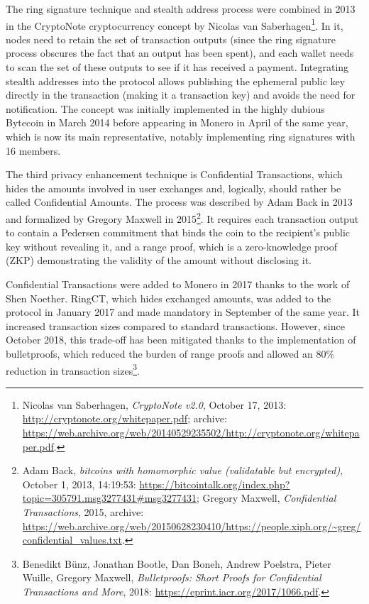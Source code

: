 \documentclass[
  a5paper,
  smalldemyvopaper,10pt,twoside,onecolumn,openright,extrafontsizes,hidelinks]{memoir}
\begin{document}
The ring signature technique and stealth address process were combined
in 2013 in the CryptoNote cryptocurrency concept by Nicolas van
Saberhagen\footnote{Nicolas van Saberhagen, \emph{CryptoNote v2.0},
  October 17, 2013: \url{http://cryptonote.org/whitepaper.pdf}; archive:
  \url{https://web.archive.org/web/20140529235502/http://cryptonote.org/whitepaper.pdf}.}.
In it, nodes need to retain the set of transaction outputs (since the
ring signature process obscures the fact that an output has been spent),
and each wallet needs to scan the set of these outputs to see if it has
received a payment. Integrating stealth addresses into the protocol
allows publishing the ephemeral public key directly in the transaction
(making it a transaction key) and avoids the need for notification. The
concept was initially implemented in the highly dubious Bytecoin in
March 2014 before appearing in Monero in April of the same year, which
is now its main representative, notably implementing ring signatures
with 16 members.

The third privacy enhancement technique is Confidential Transactions,
which hides the amounts involved in user exchanges and, logically,
should rather be called Confidential Amounts. The process was described
by Adam Back in 2013 and formalized by Gregory Maxwell in
2015\footnote{Adam Back, \emph{bitcoins with homomorphic value
  (validatable but encrypted)}, October 1, 2013, 14:19:53:
  \url{https://bitcointalk.org/index.php?topic=305791.msg3277431\#msg3277431};
  Gregory Maxwell, \emph{Confidential Transactions}, 2015, archive:
  \url{https://web.archive.org/web/20150628230410/https://people.xiph.org/~greg/confidential_values.txt}.}.
It requires each transaction output to contain a Pedersen commitment
that binds the coin to the recipient's public key without revealing it,
and a range proof, which is a zero-knowledge proof (ZKP) demonstrating
the validity of the amount without disclosing it.

Confidential Transactions were added to Monero in 2017 thanks to the
work of Shen Noether. RingCT, which hides exchanged amounts, was added
to the protocol in January 2017 and made mandatory in September of the
same year. It increased transaction sizes compared to standard
transactions. However, since October 2018, this trade-off has been
mitigated thanks to the implementation of bulletproofs, which reduced
the burden of range proofs and allowed an 80\% reduction in transaction
sizes\footnote{Benedikt Bünz, Jonathan Bootle, Dan Boneh, Andrew
  Poelstra, Pieter Wuille, Gregory Maxwell, \emph{Bulletproofs: Short
  Proofs for Confidential Transactions and More}, 2018:
  \url{https://eprint.iacr.org/2017/1066.pdf}.}.
\end{document}
